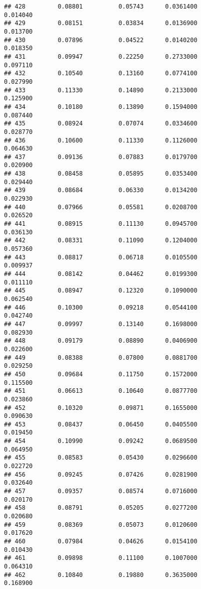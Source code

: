 \documentclass[
]{article}
\begin{document}
\begin{verbatim}
## 428         0.08801          0.05743      0.0361400            0.014040
## 429         0.08151          0.03834      0.0136900            0.013700
## 430         0.07896          0.04522      0.0140200            0.018350
## 431         0.09947          0.22250      0.2733000            0.097110
## 432         0.10540          0.13160      0.0774100            0.027990
## 433         0.11330          0.14890      0.2133000            0.125900
## 434         0.10180          0.13890      0.1594000            0.087440
## 435         0.08924          0.07074      0.0334600            0.028770
## 436         0.10600          0.11330      0.1126000            0.064630
## 437         0.09136          0.07883      0.0179700            0.020900
## 438         0.08458          0.05895      0.0353400            0.029440
## 439         0.08684          0.06330      0.0134200            0.022930
## 440         0.07966          0.05581      0.0208700            0.026520
## 441         0.08915          0.11130      0.0945700            0.036130
## 442         0.08331          0.11090      0.1204000            0.057360
## 443         0.08817          0.06718      0.0105500            0.009937
## 444         0.08142          0.04462      0.0199300            0.011110
## 445         0.08947          0.12320      0.1090000            0.062540
## 446         0.10300          0.09218      0.0544100            0.042740
## 447         0.09997          0.13140      0.1698000            0.082930
## 448         0.09179          0.08890      0.0406900            0.022600
## 449         0.08388          0.07800      0.0881700            0.029250
## 450         0.09684          0.11750      0.1572000            0.115500
## 451         0.06613          0.10640      0.0877700            0.023860
## 452         0.10320          0.09871      0.1655000            0.090630
## 453         0.08437          0.06450      0.0405500            0.019450
## 454         0.10990          0.09242      0.0689500            0.064950
## 455         0.08583          0.05430      0.0296600            0.022720
## 456         0.09245          0.07426      0.0281900            0.032640
## 457         0.09357          0.08574      0.0716000            0.020170
## 458         0.08791          0.05205      0.0277200            0.020680
## 459         0.08369          0.05073      0.0120600            0.017620
## 460         0.07984          0.04626      0.0154100            0.010430
## 461         0.09898          0.11100      0.1007000            0.064310
## 462         0.10840          0.19880      0.3635000            0.168900

\end{verbatim}
\end{document}
